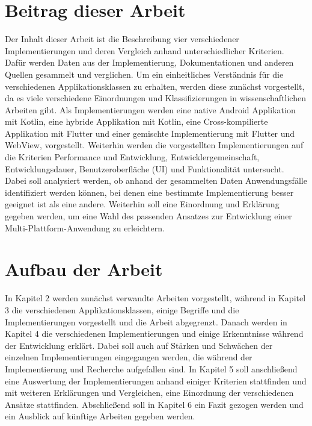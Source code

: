\section{Beitrag dieser Arbeit}
Der Inhalt dieser Arbeit ist die Beschreibung vier verschiedener Implementierungen und deren Vergleich anhand unterschiedlicher Kriterien. Dafür werden Daten aus der Implementierung, Dokumentationen und anderen Quellen gesammelt und verglichen.
Um ein einheitliches Verständnis für die verschiedenen Applikationsklassen zu erhalten, werden diese zunächst vorgestellt, da es viele verschiedene Einordnungen und Klassifizierungen in wissenschaftlichen Arbeiten gibt.
Als Implementierungen werden eine native Android Applikation mit Kotlin, eine hybride Applikation mit Kotlin, eine Cross-kompilierte Applikation mit Flutter und einer gemischte Implementierung mit Flutter und WebView, vorgestellt. 
Weiterhin werden die vorgestellten Implementierungen auf die Kriterien Performance und Entwicklung, Entwicklergemeinschaft, Entwicklungsdauer, Benutzeroberfläche (UI) und Funktionalität untersucht.
Dabei soll analysiert werden, ob anhand der gesammelten Daten Anwendungsfälle identifiziert werden können, bei denen eine bestimmte Implementierung besser geeignet ist als eine andere. Weiterhin soll eine Einordnung und Erklärung gegeben werden, um eine Wahl des passenden Ansatzes zur Entwicklung einer Multi-Plattform-Anwendung zu erleichtern.


\section{Aufbau der Arbeit}
In Kapitel 2 werden zunächst verwandte Arbeiten vorgestellt, während in Kapitel 3 die verschiedenen Applikationsklassen, einige Begriffe und die Implementierungen vorgestellt und die Arbeit abgegrenzt.
Danach werden in Kapitel 4 die verschiedenen Implementierungen und einige Erkenntnisse während der Entwicklung erklärt. Dabei soll auch auf Stärken und Schwächen der einzelnen Implementierungen eingegangen werden, die während der Implementierung und Recherche aufgefallen sind.
In Kapitel 5 soll anschließend eine Auswertung der Implementierungen anhand einiger Kriterien stattfinden und mit weiteren Erklärungen und Vergleichen, eine Einordnung der verschiedenen Ansätze stattfinden. Abschließend soll in Kapitel 6 ein Fazit gezogen werden und ein Ausblick auf künftige Arbeiten gegeben werden.